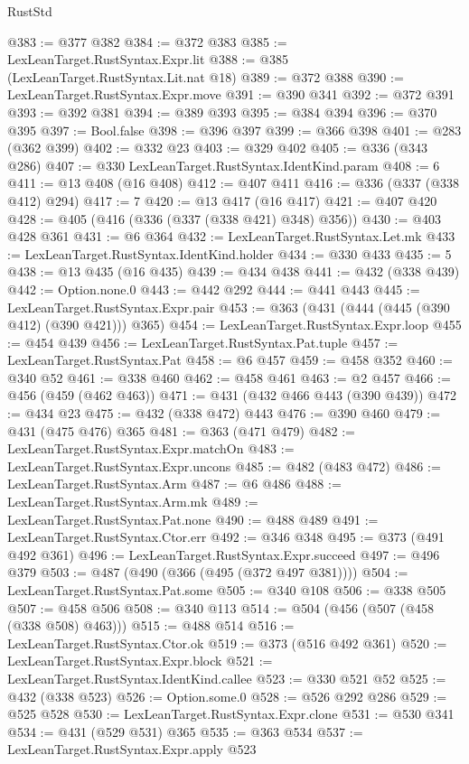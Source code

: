 \begin{lexlean}{RustStd}
\begin{coremodule}
@383 := @377 @382
@384 := @372 @383
@385 := LexLeanTarget.RustSyntax.Expr.lit
@388 := @385 (LexLeanTarget.RustSyntax.Lit.nat @18)
@389 := @372 @388
@390 := LexLeanTarget.RustSyntax.Expr.move
@391 := @390 @341
@392 := @372 @391
@393 := @392 @381
@394 := @389 @393
@395 := @384 @394
@396 := @370 @395
@397 := Bool.false
@398 := @396 @397
@399 := @366 @398
@401 := @283 (@362 @399)
@402 := @332 @23
@403 := @329 @402
@405 := @336 (@343 @286)
@407 := @330 LexLeanTarget.RustSyntax.IdentKind.param
@408 := 6
@411 := @13 @408 (@16 @408)
@412 := @407 @411
@416 := @336 (@337 (@338 @412) @294)
@417 := 7
@420 := @13 @417 (@16 @417)
@421 := @407 @420
@428 := @405 (@416 (@336 (@337 (@338 @421) @348) @356))
@430 := @403 @428 @361
@431 := @6 @364
@432 := LexLeanTarget.RustSyntax.Let.mk
@433 := LexLeanTarget.RustSyntax.IdentKind.holder
@434 := @330 @433
@435 := 5
@438 := @13 @435 (@16 @435)
@439 := @434 @438
@441 := @432 (@338 @439)
@442 := Option.none.{0}
@443 := @442 @292
@444 := @441 @443
@445 := LexLeanTarget.RustSyntax.Expr.pair
@453 := @363 (@431 (@444 (@445 (@390 @412) (@390 @421))) @365)
@454 := LexLeanTarget.RustSyntax.Expr.loop
@455 := @454 @439
@456 := LexLeanTarget.RustSyntax.Pat.tuple
@457 := LexLeanTarget.RustSyntax.Pat
@458 := @6 @457
@459 := @458 @352
@460 := @340 @52
@461 := @338 @460
@462 := @458 @461
@463 := @2 @457
@466 := @456 (@459 (@462 @463))
@471 := @431 (@432 @466 @443 (@390 @439))
@472 := @434 @23
@475 := @432 (@338 @472) @443
@476 := @390 @460
@479 := @431 (@475 @476) @365
@481 := @363 (@471 @479)
@482 := LexLeanTarget.RustSyntax.Expr.matchOn
@483 := LexLeanTarget.RustSyntax.Expr.uncons
@485 := @482 (@483 @472)
@486 := LexLeanTarget.RustSyntax.Arm
@487 := @6 @486
@488 := LexLeanTarget.RustSyntax.Arm.mk
@489 := LexLeanTarget.RustSyntax.Pat.none
@490 := @488 @489
@491 := LexLeanTarget.RustSyntax.Ctor.err
@492 := @346 @348
@495 := @373 (@491 @492 @361)
@496 := LexLeanTarget.RustSyntax.Expr.succeed
@497 := @496 @379
@503 := @487 (@490 (@366 (@495 (@372 @497 @381))))
@504 := LexLeanTarget.RustSyntax.Pat.some
@505 := @340 @108
@506 := @338 @505
@507 := @458 @506
@508 := @340 @113
@514 := @504 (@456 (@507 (@458 (@338 @508) @463)))
@515 := @488 @514
@516 := LexLeanTarget.RustSyntax.Ctor.ok
@519 := @373 (@516 @492 @361)
@520 := LexLeanTarget.RustSyntax.Expr.block
@521 := LexLeanTarget.RustSyntax.IdentKind.callee
@523 := @330 @521 @52
@525 := @432 (@338 @523)
@526 := Option.some.{0}
@528 := @526 @292 @286
@529 := @525 @528
@530 := LexLeanTarget.RustSyntax.Expr.clone
@531 := @530 @341
@534 := @431 (@529 @531) @365
@535 := @363 @534
@537 := LexLeanTarget.RustSyntax.Expr.apply @523

\end{coremodule}
\end{lexlean}

